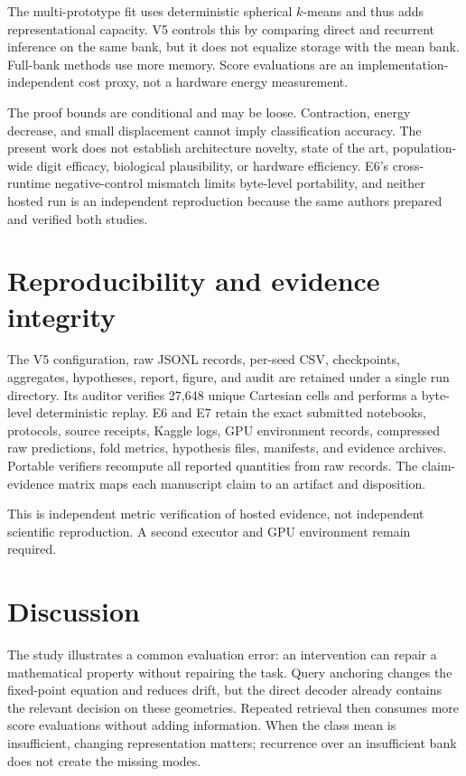 \documentclass[11pt]{article}
\begin{document}
The multi-prototype fit uses deterministic spherical $k$-means and thus adds representational capacity. V5 controls this by comparing direct and recurrent inference on the same bank, but it does not equalize storage with the mean bank. Full-bank methods use more memory. Score evaluations are an implementation-independent cost proxy, not a hardware energy measurement.

The proof bounds are conditional and may be loose. Contraction, energy decrease, and small displacement cannot imply classification accuracy. The present work does not establish architecture novelty, state of the art, population-wide digit efficacy, biological plausibility, or hardware efficiency. E6's cross-runtime negative-control mismatch limits byte-level portability, and neither hosted run is an independent reproduction because the same authors prepared and verified both studies.

\section{Reproducibility and evidence integrity}
The V5 configuration, raw JSONL records, per-seed CSV, checkpoints, aggregates, hypotheses, report, figure, and audit are retained under a single run directory. Its auditor verifies 27,648 unique Cartesian cells and performs a byte-level deterministic replay. E6 and E7 retain the exact submitted notebooks, protocols, source receipts, Kaggle logs, GPU environment records, compressed raw predictions, fold metrics, hypothesis files, manifests, and evidence archives. Portable verifiers recompute all reported quantities from raw records. The claim-evidence matrix maps each manuscript claim to an artifact and disposition.

This is independent metric verification of hosted evidence, not independent scientific reproduction. A second executor and GPU environment remain required.

\section{Discussion}
The study illustrates a common evaluation error: an intervention can repair a mathematical property without repairing the task. Query anchoring changes the fixed-point equation and reduces drift, but the direct decoder already contains the relevant decision on these geometries. Repeated retrieval then consumes more score evaluations without adding information. When the class mean is insufficient, changing representation matters; recurrence over an insufficient bank does not create the missing modes.
\end{document}
